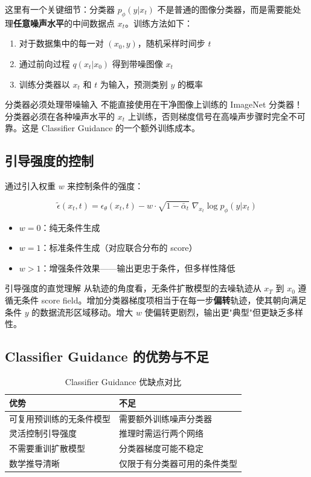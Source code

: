 \documentclass[a4paper]{article}
\begin{document}
这里有一个关键细节：分类器 $p_\phi(y|x_t)$ 不是普通的图像分类器，而是需要能处理\textbf{任意噪声水平}的中间数据点 $x_t$。训练方法如下：

\begin{enumerate}
    \item 对于数据集中的每一对 $(x_0, y)$，随机采样时间步 $t$
    \item 通过前向过程 $q(x_t|x_0)$ 得到带噪图像 $x_t$
    \item 训练分类器以 $x_t$ 和 $t$ 为输入，预测类别 $y$ 的概率
\end{enumerate}

\begin{warningbox}{分类器必须处理带噪输入}
不能直接使用在干净图像上训练的 ImageNet 分类器！分类器必须在各种噪声水平的 $x_t$ 上训练，否则梯度信号在高噪声步骤时完全不可靠。这是 Classifier Guidance 的一个额外训练成本。
\end{warningbox}

\subsection{引导强度的控制}

通过引入权重 $w$ 来控制条件的强度：

$$
\tilde{\epsilon}(x_t, t) = \epsilon_\theta(x_t, t) - w\cdot\sqrt{1-\bar\alpha_t}\;\nabla_{x_t}\log p_\phi(y|x_t)
$$

\begin{itemize}
    \item $w = 0$：纯无条件生成
    \item $w = 1$：标准条件生成（对应联合分布的 score）
    \item $w > 1$：增强条件效果——输出更忠于条件，但多样性降低
\end{itemize}

\begin{knowledgebox}{引导强度的直觉理解}
从轨迹的角度看，无条件扩散模型的去噪轨迹从 $x_T$ 到 $x_0$ 遵循无条件 score field。增加分类器梯度项相当于在每一步\textbf{偏转}轨迹，使其朝向满足条件 $y$ 的数据流形区域移动。增大 $w$ 使偏转更剧烈，输出更"典型"但更缺乏多样性。
\end{knowledgebox}

\subsection{Classifier Guidance 的优势与不足}

\begin{table}[H]
\centering
\begin{tabular}{p{6cm}p{6cm}}
\toprule
\textbf{优势} & \textbf{不足} \\
\midrule
可复用预训练的无条件模型 & 需要额外训练噪声分类器 \\
灵活控制引导强度 & 推理时需运行两个网络 \\
不需要重训扩散模型 & 分类器梯度可能不稳定 \\
数学推导清晰 & 仅限于有分类器可用的条件类型 \\
\bottomrule
\end{tabular}
\caption{Classifier Guidance 优缺点对比}
\end{table}
\end{document}
